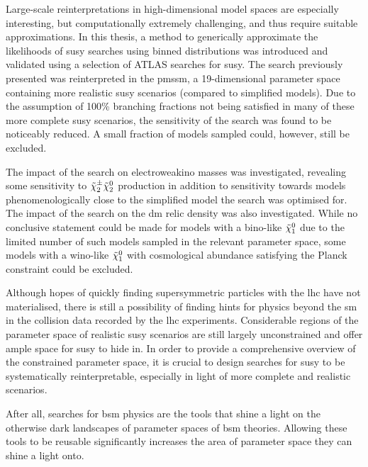 Large-scale reinterpretations in high-dimensional model spaces are especially interesting, but computationally extremely challenging, and thus require suitable approximations. In this thesis, a method to generically approximate the likelihoods of \gls{susy} searches using binned distributions was introduced and validated using a selection of ATLAS searches for \gls{susy}.
The search previously presented was reinterpreted in the \gls{pmssm}, a 19-dimensional parameter space containing more realistic \gls{susy} scenarios (compared to simplified models). Due to the assumption of 100\% branching fractions not being satisfied in many of these more complete \gls{susy} scenarios, the sensitivity of the \onelepton search was found to be noticeably reduced. A small fraction of models sampled could, however, still be excluded.

The impact of the \onelepton search on electroweakino masses was investigated, revealing some sensitivity to $\tilde{\chi}_2^\pm\tilde{\chi}_2^0$ production in addition to sensitivity towards models phenomenologically close to the simplified model the search was optimised for.
The impact of the \onelepton search on the \gls{dm} relic density was also investigated.
While no conclusive statement could be made for models with a bino-like $\tilde{\chi}_1^0$ due to the limited number of such models sampled in the relevant parameter space, some models with a wino-like $\tilde{\chi}_1^0$ with cosmological abundance satisfying the Planck constraint could be excluded. 
 
 Although hopes of quickly finding supersymmetric particles with the \gls{lhc} have not materialised, there is still a possibility of finding hints for physics beyond the \gls{sm} in the collision data recorded by the \gls{lhc} experiments.
 Considerable regions of the parameter space of realistic \gls{susy} scenarios are still largely unconstrained and offer ample space for \gls{susy} to hide in.
 In order to provide a comprehensive overview of the constrained parameter space, it is crucial to design searches for \gls{susy} to be systematically reinterpretable, especially in light of more complete and realistic scenarios.
 
 After all, searches for \gls{bsm} physics are the tools that shine a light on the otherwise dark landscapes of parameter spaces of \gls{bsm} theories.
 Allowing these tools to be reusable significantly increases the area of parameter space they can shine a light onto.    
 